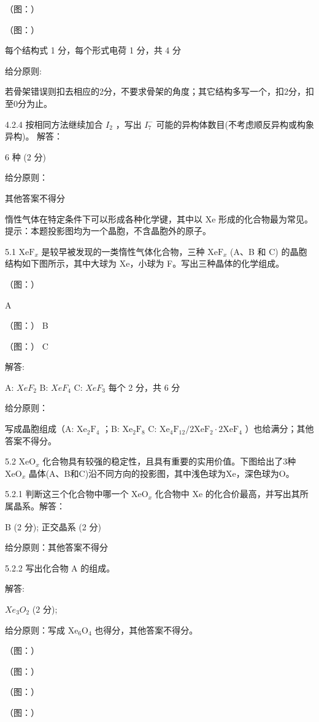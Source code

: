 （图：）

（图：）

每个结构式 1 分，每个形式电荷 1 分，共 4 分

给分原则:

若骨架错误则扣去相应的2分，不要求骨架的角度；其它结构多写一个，扣2分，扣至0分为止。

4.2.4 按相同方法继续加合 $I_{2}$ ，写出 $I_{7}^{-}$ 可能的异构体数目(不考虑顺反异构或构象异构)。
解答：

6 种 (2 分)

给分原则：

其他答案不得分

惰性气体在特定条件下可以形成各种化学键，其中以 Xe 形成的化合物最为常见。提示：本题投影图均为一个晶胞，不含晶胞外的原子。

5.1 $\mathrm{XeF}_x$ 是较早被发现的一类惰性气体化合物，三种 $\mathrm{XeF}_x$ (A、B 和 C) 的晶胞结构如下图所示，其中大球为 Xe，小球为 F。写出三种晶体的化学组成。

（图：）

A

（图：）
B

（图：）
C

解答:

A: $XeF_{2}$ B: $XeF_{4}$ C: $XeF_{3}$ 每个 2 分，共 6 分

给分原则：

写成晶胞组成（A: $\mathrm{Xe}_2\mathrm{F}_4$ ；B: $\mathrm{Xe}_2\mathrm{F}_8$ C: $\mathrm{Xe}_4\mathrm{F}_{12} / 2\mathrm{XeF}_2\cdot 2\mathrm{XeF}_4$ ）也给满分；其他答案不得分。

5.2 $\mathrm{XeO}_x$ 化合物具有较强的稳定性，且具有重要的实用价值。下图给出了3种 $\mathrm{XeO}_x$ 晶体(A、B和C)沿不同方向的投影图，其中浅色球为Xe，深色球为O。

5.2.1 判断这三个化合物中哪一个 $\mathrm{XeO}_x$ 化合物中 $\mathrm{Xe}$ 的化合价最高，并写出其所属晶系。解答：

B (2 分); 正交晶系 (2 分)

给分原则：其他答案不得分

5.2.2 写出化合物 A 的组成。

解答:

$Xe_{3}O_{2}$ (2 分);

给分原则：写成 $\mathrm{Xe_6O_4}$ 也得分，其他答案不得分。

（图：）

（图：）

（图：）

（图：）

